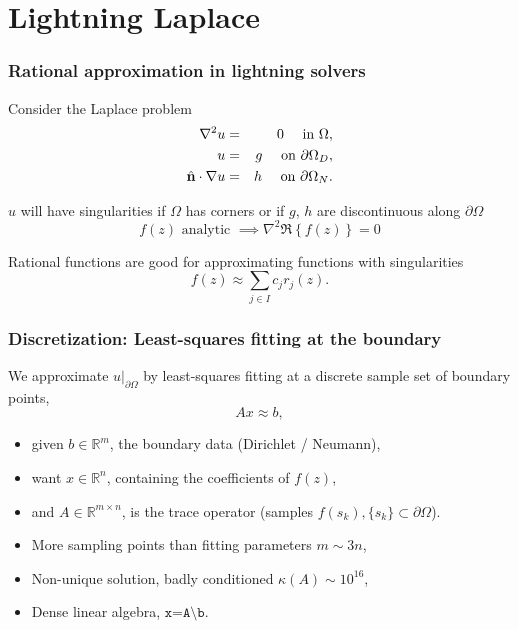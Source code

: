 
\section{Lightning Laplace}


\begin{frame}
\frametitle{Rational approximation in lightning solvers}
Consider the Laplace problem
\begin{eqnarray*}
	\nabla^2 u &=& 0 \quad\text{ in } \Omega,\\
	u &=& g \quad\text{ on } \partial\Omega_D,\\
	\hat{\mathbf{n}}\cdot\nabla u &=& h \quad\text{ on } \partial\Omega_N.
\end{eqnarray*}

$u$ will have singularities if $\Omega$ has corners or if $g$, $h$ are discontinuous along $\partial \Omega$ 
\begin{equation*}
f(z)\text{ analytic }\implies \nabla^2 \Re\left\{f(z)\right\} = 0
\end{equation*}

\bigskip
Rational functions are good for approximating functions with singularities
\begin{equation*}
f(z)\approx \sum_{j\in I} c_j r_j(z).
\end{equation*}

\end{frame}


\begin{frame}
\frametitle{Discretization: Least-squares fitting at the boundary}
We approximate $\left.u\right|_{\partial\Omega}$ by least-squares fitting at a discrete sample set of boundary points,
\begin{equation*}
A x \approx b,
\end{equation*}
\begin{itemize}
\item given $b\in\mathbb{R}^m$, the boundary data (Dirichlet / Neumann),
\item want $x\in\mathbb{R}^n$, containing the coefficients of $f(z)$,
\item  and $A\in\mathbb{R}^{m\times n}$, is the trace operator (samples $f(s_k), \{s_k\}\subset\partial\Omega$).
\end{itemize}

\begin{itemize}
\item More sampling points than fitting parameters $m\sim 3n$,
\item Non-unique solution, badly conditioned $\kappa(A)\sim 10^{16}$,
\item Dense linear algebra, $\texttt{x=A\textbackslash b}$.
\end{itemize}

\end{frame}



